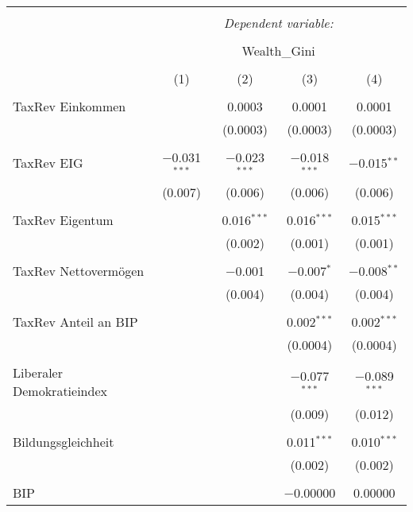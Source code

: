 
\begin{table}[!htbp] \centering 
  \caption{} 
  \label{} 
\begin{tabular}{@{\extracolsep{5pt}}lcccc} 
\\[-1.8ex]\hline 
\hline \\[-1.8ex] 
 & \multicolumn{4}{c}{\textit{Dependent variable:}} \\ 
\cline{2-5} 
\\[-1.8ex] & \multicolumn{4}{c}{Wealth\_Gini} \\ 
\\[-1.8ex] & (1) & (2) & (3) & (4)\\ 
\hline \\[-1.8ex] 
 TaxRev Einkommen &  & 0.0003 & 0.0001 & 0.0001 \\ 
  &  & (0.0003) & (0.0003) & (0.0003) \\ 
  & & & & \\ 
 TaxRev EIG & $-$0.031$^{***}$ & $-$0.023$^{***}$ & $-$0.018$^{***}$ & $-$0.015$^{**}$ \\ 
  & (0.007) & (0.006) & (0.006) & (0.006) \\ 
  & & & & \\ 
 TaxRev Eigentum &  & 0.016$^{***}$ & 0.016$^{***}$ & 0.015$^{***}$ \\ 
  &  & (0.002) & (0.001) & (0.001) \\ 
  & & & & \\ 
 TaxRev Nettovermögen &  & $-$0.001 & $-$0.007$^{*}$ & $-$0.008$^{**}$ \\ 
  &  & (0.004) & (0.004) & (0.004) \\ 
  & & & & \\ 
 TaxRev Anteil an BIP &  &  & 0.002$^{***}$ & 0.002$^{***}$ \\ 
  &  &  & (0.0004) & (0.0004) \\ 
  & & & & \\ 
 Liberaler Demokratieindex &  &  & $-$0.077$^{***}$ & $-$0.089$^{***}$ \\ 
  &  &  & (0.009) & (0.012) \\ 
  & & & & \\ 
 Bildungsgleichheit &  &  & 0.011$^{***}$ & 0.010$^{***}$ \\ 
  &  &  & (0.002) & (0.002) \\ 
  & & & & \\ 
 BIP &  &  & $-$0.00000 & 0.00000 \\ 

\end{tabular}
\end{table}

